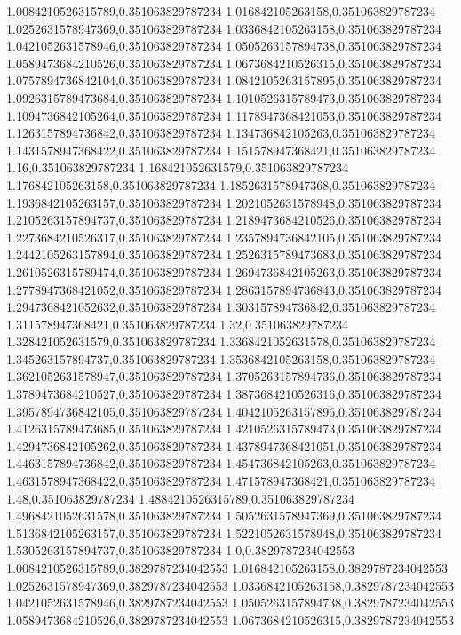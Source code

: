 1.0084210526315789,0.351063829787234
1.016842105263158,0.351063829787234
1.0252631578947369,0.351063829787234
1.0336842105263158,0.351063829787234
1.0421052631578946,0.351063829787234
1.0505263157894738,0.351063829787234
1.0589473684210526,0.351063829787234
1.0673684210526315,0.351063829787234
1.0757894736842104,0.351063829787234
1.0842105263157895,0.351063829787234
1.0926315789473684,0.351063829787234
1.1010526315789473,0.351063829787234
1.1094736842105264,0.351063829787234
1.1178947368421053,0.351063829787234
1.1263157894736842,0.351063829787234
1.134736842105263,0.351063829787234
1.1431578947368422,0.351063829787234
1.151578947368421,0.351063829787234
1.16,0.351063829787234
1.168421052631579,0.351063829787234
1.176842105263158,0.351063829787234
1.1852631578947368,0.351063829787234
1.1936842105263157,0.351063829787234
1.2021052631578948,0.351063829787234
1.2105263157894737,0.351063829787234
1.2189473684210526,0.351063829787234
1.2273684210526317,0.351063829787234
1.2357894736842105,0.351063829787234
1.2442105263157894,0.351063829787234
1.2526315789473683,0.351063829787234
1.2610526315789474,0.351063829787234
1.2694736842105263,0.351063829787234
1.2778947368421052,0.351063829787234
1.2863157894736843,0.351063829787234
1.2947368421052632,0.351063829787234
1.303157894736842,0.351063829787234
1.311578947368421,0.351063829787234
1.32,0.351063829787234
1.328421052631579,0.351063829787234
1.3368421052631578,0.351063829787234
1.345263157894737,0.351063829787234
1.3536842105263158,0.351063829787234
1.3621052631578947,0.351063829787234
1.3705263157894736,0.351063829787234
1.3789473684210527,0.351063829787234
1.3873684210526316,0.351063829787234
1.3957894736842105,0.351063829787234
1.4042105263157896,0.351063829787234
1.4126315789473685,0.351063829787234
1.4210526315789473,0.351063829787234
1.4294736842105262,0.351063829787234
1.4378947368421051,0.351063829787234
1.4463157894736842,0.351063829787234
1.454736842105263,0.351063829787234
1.4631578947368422,0.351063829787234
1.471578947368421,0.351063829787234
1.48,0.351063829787234
1.4884210526315789,0.351063829787234
1.4968421052631578,0.351063829787234
1.5052631578947369,0.351063829787234
1.5136842105263157,0.351063829787234
1.5221052631578948,0.351063829787234
1.5305263157894737,0.351063829787234
1.0,0.3829787234042553
1.0084210526315789,0.3829787234042553
1.016842105263158,0.3829787234042553
1.0252631578947369,0.3829787234042553
1.0336842105263158,0.3829787234042553
1.0421052631578946,0.3829787234042553
1.0505263157894738,0.3829787234042553
1.0589473684210526,0.3829787234042553
1.0673684210526315,0.3829787234042553
